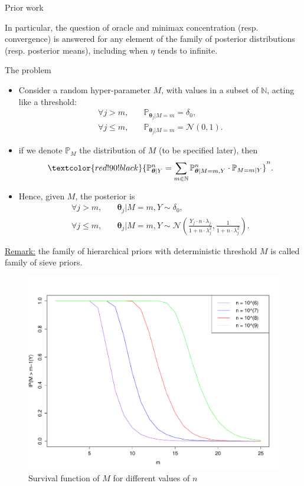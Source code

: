 \documentclass[final,hyperref={pdfpagelabels=false}]{beamer}
\begin{document}
\begin{frame}[t]
\begin{columns}[t]
\begin{column}{.30\textwidth}
\begin{block}{\rule{0pt}{2.5ex} Prior work}
\medskip

In particular, the question of oracle and minimax concentration (resp. convergence) is answered for any element of the family of posterior distributions (resp. posterior means), including when $\eta$ tends to infinite.
\end{block}


\begin{block}{\rule{0pt}{2.5ex} The problem}


\begin{itemize}
\item Consider a \textcolor{red!90!black}{random hyper-parameter $M$}, with values in a subset of $\mathbb{N}$, acting like a threshold:
\begin{align*}
\forall j > m ,& \quad \mathbb{P}_{\boldsymbol{\theta}_{j}\vert M = m} = \delta_{0},\\
\forall j \leq m ,& \quad \mathbb{P}_{\boldsymbol{\theta}_{j}\vert M = m} = \mathcal{N}\left(0, 1\right).
\end{align*}
\item if we denote $\mathbb{P}_{M}$ the distribution of $M$ (to be specified later), then
\[\textcolor{red!90!black}{\mathbb{P}_{\boldsymbol{\theta}\vert Y}^{n} = \sum\limits_{m \in \mathbb{N}} \mathbb{P}_{\boldsymbol{\theta} \vert M = m, Y}^{n} \cdot \mathbb{P}_{M = m \vert Y}}^{n}.\]
\end{itemize}

\begin{itemize}
\item Hence, given $M$, the posterior is
\begin{align*}
\forall j > m, &\quad \boldsymbol{\theta}_{j} \vert M = m, Y \sim \delta_{0},\\
\forall j \leq m, &\quad \boldsymbol{\theta}_{j} \vert M = m, Y \sim \mathcal{N}\left(\frac{Y_{j} \cdot n \cdot \lambda_{j}}{1 + n \cdot \lambda_{j}^{2}}, \frac{1}{1 + n \cdot \lambda_{j}^{2}} \right).
\end{align*}
\end{itemize}
\underline{Remark:} the family of hierarchical priors with deterministic threshold $M$ is called family of sieve priors.

\begin{figure}
\centering
 \includegraphics[width=0.4\linewidth]{M.pdf}
\caption{Survival function of $M$ for different values of $n$}\label{M}
\end{figure}


\end{block}
\end{column}
\end{columns}
\end{frame}
\end{document}
